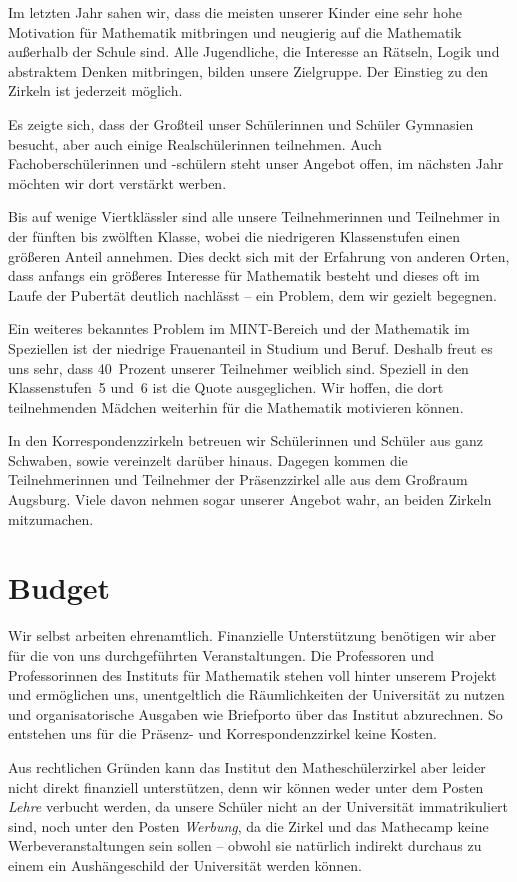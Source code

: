 \documentclass[12pt]{zettel}
\begin{document}
Im letzten Jahr sahen wir, dass die meisten unserer Kinder eine
sehr hohe Motivation für Mathematik mitbringen und neugierig auf die
Mathematik außerhalb der Schule sind. Alle Jugendliche, die Interesse an
Rätseln, Logik und abstraktem Denken mitbringen, bilden unsere
Zielgruppe. Der Einstieg zu den Zirkeln ist jederzeit möglich.

Es zeigte sich, dass der Großteil unser Schülerinnen und
Schüler Gymnasien besucht, aber auch einige Realschülerinnen teilnehmen.
Auch Fachoberschülerinnen und -schülern steht unser Angebot offen, im nächsten
Jahr möchten wir dort verstärkt werben.

Bis auf wenige Viertklässler sind alle unsere Teilnehmerinnen und
Teilnehmer in der fünften bis zwölften Klasse, wobei die niedrigeren
Klassenstufen einen größeren Anteil annehmen. Dies deckt sich mit der
Erfahrung von anderen Orten, dass anfangs ein größeres Interesse für
Mathematik besteht und dieses oft im Laufe der Pubertät
deutlich nachlässt -- ein Problem, dem wir gezielt begegnen.

Ein weiteres bekanntes Problem im MINT-Bereich
und der Mathematik im Speziellen ist der niedrige Frauenanteil in
Studium und Beruf. Deshalb freut es uns sehr, dass 40~Prozent unserer
Teilnehmer weiblich sind. Speziell in den Klassenstufen~5 und~6 ist die Quote
ausgeglichen. Wir hoffen, die dort teilnehmenden Mädchen weiterhin für die
Mathematik motivieren können.

In den Korrespondenzzirkeln betreuen wir Schülerinnen und Schüler aus ganz
Schwaben, sowie vereinzelt darüber hinaus. Dagegen kommen die Teilnehmerinnen
und Teilnehmer der Präsenzzirkel alle aus dem Großraum Augsburg. Viele davon
nehmen sogar unserer Angebot wahr, an beiden Zirkeln mitzumachen.


\section{Budget}

Wir selbst arbeiten ehrenamtlich. Finanzielle Unterstützung benötigen wir aber
für die von uns durchgeführten Veranstaltungen. Die Professoren und
Professorinnen des Instituts für Mathematik stehen voll hinter unserem Projekt
und ermöglichen uns, unentgeltlich die Räumlichkeiten der Universität zu nutzen
und organisatorische Ausgaben wie Briefporto über das Institut abzurechnen.
So entstehen uns für die Präsenz- und Korrespondenzzirkel keine Kosten.

Aus rechtlichen Gründen kann das Institut den Matheschülerzirkel aber leider nicht
direkt finanziell unterstützen, denn wir können weder unter dem Posten
\emph{Lehre} verbucht werden, da unsere Schüler nicht an der Universität
immatrikuliert sind, noch unter den Posten \emph{Werbung}, da die Zirkel und
das Mathecamp keine Werbeveranstaltungen sein sollen -- obwohl sie natürlich indirekt
durchaus zu einem ein Aushängeschild der Universität werden können.
\end{document}
